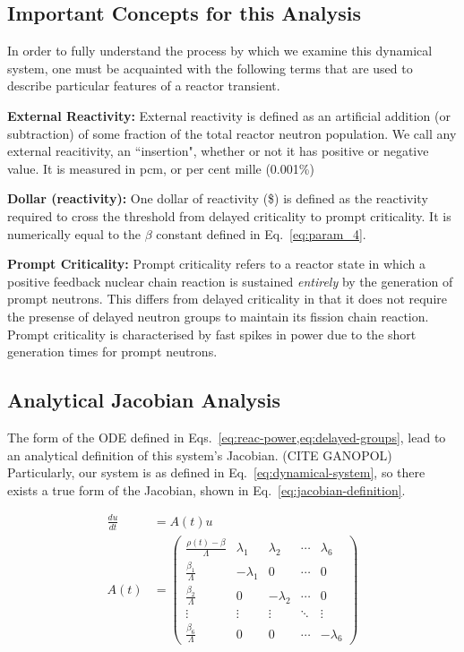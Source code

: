 \documentclass[review,onefignum,onetabnum]{siamart171218}
\begin{document}
\subsection{Important Concepts for this Analysis}
In order to fully understand the process by which we examine this dynamical system,
one must be acquainted with the following terms that are used to describe particular
features of a reactor transient.
\begin{definition}{\textbf{External Reactivity:}}
  External reactivity is defined as an artificial addition (or subtraction) of
  some fraction of the total reactor neutron population. We call any external reacitivity,
  an ``insertion", whether or not it has positive or negative value. It is measured in pcm,
  or per cent mille (0.001\%)
\end{definition}
\begin{definition}{\textbf{Dollar (reactivity):}}
  One dollar of reactivity (\$) is defined as the reactivity required to cross the
  threshold from delayed criticality to prompt criticality. It is numerically equal
  to the $\beta$ constant defined in Eq.~\cref{eq:param_4}.
\end{definition}
\begin{definition}{\textbf{Prompt Criticality:}}
  Prompt criticality refers to a reactor state in which a positive feedback nuclear
  chain reaction is sustained \emph{entirely} by the generation of prompt neutrons.
  This differs from delayed criticality in that it does not require the presense of
  delayed neutron groups to maintain its fission chain reaction. Prompt criticality
  is characterised by fast spikes in power due to the short generation times for
  prompt neutrons.
\end{definition}


\subsection{Analytical Jacobian Analysis}
The form of the ODE defined in Eqs.~\cref{eq:reac-power,eq:delayed-groups},
lead to an analytical definition of this system's Jacobian. (CITE GANOPOL)
Particularly, our system is as defined in Eq.~\cref{eq:dynamical-system}, so
there exists a true form of the Jacobian, shown in Eq.~\cref{eq:jacobian-definition}.

\begin{align}
  \label{eq:dynamical-system}
  \frac{du}{dt} &= A(t)u\\
  \label{eq:jacobian-definition}
  A(t) &= \begin{pmatrix}\frac{\rho(t)-\beta}{\Lambda}&\lambda_1&\lambda_2&\cdots&\lambda_6\\
                      \frac{\beta_1}{\Lambda}&-\lambda_1&0&\cdots&0\\
                      \frac{\beta_2}{\Lambda}&0&-\lambda_2&\cdots&0\\
                      \vdots&\vdots&\vdots&\ddots&\vdots\\
                      \frac{\beta_6}{\Lambda}&0&0&\cdots&-\lambda_6\end{pmatrix}
\end{align}
\end{document}
